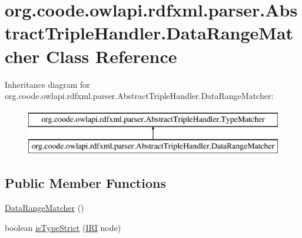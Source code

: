 \hypertarget{classorg_1_1coode_1_1owlapi_1_1rdfxml_1_1parser_1_1_abstract_triple_handler_1_1_data_range_matcher}{\section{org.\-coode.\-owlapi.\-rdfxml.\-parser.\-Abstract\-Triple\-Handler.\-Data\-Range\-Matcher Class Reference}
\label{classorg_1_1coode_1_1owlapi_1_1rdfxml_1_1parser_1_1_abstract_triple_handler_1_1_data_range_matcher}
}
Inheritance diagram for org.\-coode.\-owlapi.\-rdfxml.\-parser.\-Abstract\-Triple\-Handler.\-Data\-Range\-Matcher\-:\begin{figure}[H]
\begin{center}
\leavevmode
\includegraphics[height=2.000000cm]{classorg_1_1coode_1_1owlapi_1_1rdfxml_1_1parser_1_1_abstract_triple_handler_1_1_data_range_matcher}
\end{center}
\end{figure}
\subsection*{Public Member Functions}
\begin{DoxyCompactItemize}
\item 
\hyperlink{classorg_1_1coode_1_1owlapi_1_1rdfxml_1_1parser_1_1_abstract_triple_handler_1_1_data_range_matcher_a02f71118df1ea8e9585c44a8dbdc99bf}{Data\-Range\-Matcher} ()
\item 
boolean \hyperlink{classorg_1_1coode_1_1owlapi_1_1rdfxml_1_1parser_1_1_abstract_triple_handler_1_1_data_range_matcher_aa6866b6579b8068c558b9a265d13e114}{is\-Type\-Strict} (\hyperlink{classorg_1_1semanticweb_1_1owlapi_1_1model_1_1_i_r_i}{I\-R\-I} node)
\end{DoxyCompactItemize}



